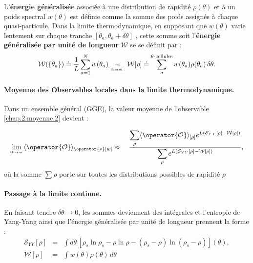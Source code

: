 L’\textbf{énergie généralisée} associée à une distribution de rapidité $\rho(\theta)$ et à un poids spectral $w(\theta)$ est définie comme la somme des poids assignés à chaque quasi-particule. 
Dans la limite thermodynamique, en supposant que $w(\theta)$ varie lentement sur chaque tranche $[\theta_a, \theta_a + \delta\theta]$ ,  cette somme soit l’\textbf{énergie généralisée par unité de longueur} $\mathcal{W}$ se se définit par :
\begin{eqnarray}
	\mathcal{W}(\{\theta_a\}) \doteq  \frac{1}{L} \sum_{a = 1}^N w(\theta_a) 
	 \underset{\mbox{\tiny therm .}}{\sim}  \mathcal{W}[\rho]  \doteq  \sum_a^{\theta\text{-cellules}} w(\theta_a) \rho(\theta_a)\, \delta\theta. 
\end{eqnarray} 


\paragraph{Moyenne des Observables locales dans la limite thermodynamique.}

Dans un ensemble général (GGE), la valeur moyenne de l’observable \eqref{chap.2.moyenne.2} devient :	
	
\begin{eqnarray}\label{chap.2.moyenne.3}
	\underset{\mbox{\tiny therm.}}{\lim} \langle \operator{\mathcal{O}} \rangle_{\operator{\varrho}[w]} &  \approx &  ~ \frac{  \displaystyle \sum_{\rho }  \langle \operator{\mathcal{O}}\rangle_{[\rho]}  e^{L(\mathcal{S}_{YY}[\rho] -  \mathcal{W}[\rho]) }}{ \displaystyle \sum_{\rho } e^{L(\mathcal{S}_{YY}[\rho] -  \mathcal{W}[\rho]) } },
\end{eqnarray}
où la somme $\sum\rho$ porte sur toutes les distributions possibles de rapidité $\rho$

\paragraph{Passage à la limite continue.}
En faisant tendre $\delta\theta \to 0$, les sommes deviennent des intégrales 
et l'entropie de Yang-Yang ainsi que l’énergie généralisée par unité de longueur prennent la forme :
\begin{eqnarray}
	\mathcal{S}_{YY}[\rho] & = & \int d \theta  \, [ \rho_s\ln \rho_s - \rho \ln \rho - ( \rho_s - \rho ) \ln ( \rho_s - \rho ) ] (\theta) , \label{chap.2.entropi.int}\\
	\mathcal{W}[\rho] & = & \int   w(\theta) \rho(\theta) \, d \theta \label{chap.2.W.int}		
\end{eqnarray}

